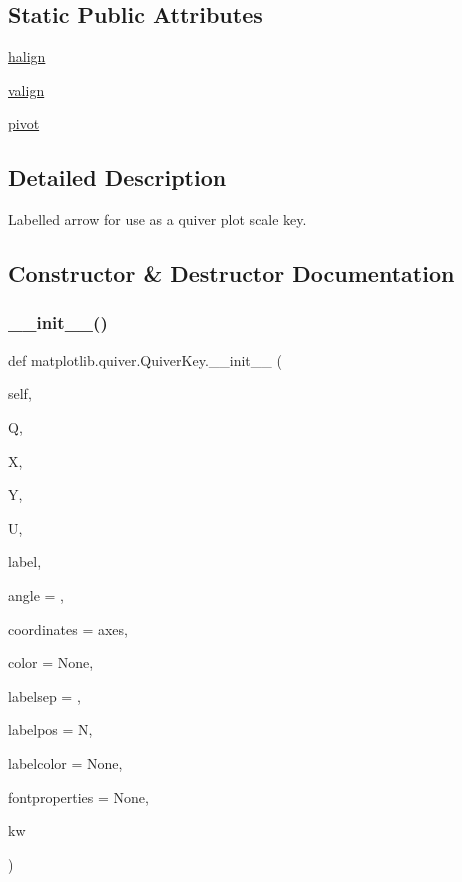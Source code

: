 \subsection*{Static Public Attributes}
\begin{DoxyCompactItemize}
\item 
\hyperlink{classmatplotlib_1_1quiver_1_1QuiverKey_ab19c5d0fabc636b935505476d727f304}{halign}
\item 
\hyperlink{classmatplotlib_1_1quiver_1_1QuiverKey_a07d20177edd7f9edc40f877744bd0a18}{valign}
\item 
\hyperlink{classmatplotlib_1_1quiver_1_1QuiverKey_ab68d4a54e3c2d238dc32e56a32b2a254}{pivot}
\end{DoxyCompactItemize}


\subsection{Detailed Description}
\begin{DoxyVerb}Labelled arrow for use as a quiver plot scale key.\end{DoxyVerb}
 

\subsection{Constructor \& Destructor Documentation}
\mbox{\label{classmatplotlib_1_1quiver_1_1QuiverKey_a0516c2e91dcf94329df812e66b135a26}} 
\subsubsection{\texorpdfstring{\+\_\+\+\_\+init\+\_\+\+\_\+()}{\_\_init\_\_()}}
{\footnotesize\ttfamily def matplotlib.\+quiver.\+Quiver\+Key.\+\_\+\+\_\+init\+\_\+\+\_\+ (\begin{DoxyParamCaption}\item[{}]{self,  }\item[{}]{Q,  }\item[{}]{X,  }\item[{}]{Y,  }\item[{}]{U,  }\item[{}]{label,  }\item[{}]{angle = {},  }\item[{}]{coordinates = {\ttfamily \textquotesingle{}axes\textquotesingle{}},  }\item[{}]{color = {\ttfamily None},  }\item[{}]{labelsep = {},  }\item[{}]{labelpos = {\ttfamily \textquotesingle{}N\textquotesingle{}},  }\item[{}]{labelcolor = {\ttfamily None},  }\item[{}]{fontproperties = {\ttfamily None},  }\item[{}]{kw }\end{DoxyParamCaption})}

